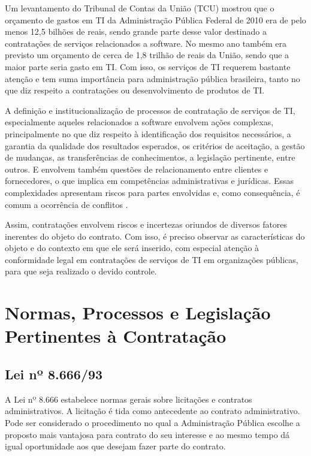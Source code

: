 Um levantamento do Tribunal de Contas da União (TCU) mostrou que o orçamento de gastos em TI da Administração Pública Federal de 2010 era de pelo menos 12,5 bilhões de reais, sendo grande parte desse valor destinado a contratações de serviços relacionados a software. No mesmo ano também era previsto um orçamento de cerca de 1,8 trilhão de reais da União, sendo que a maior parte seria gasto em TI. Com isso, os serviços de TI requerem bastante atenção e tem suma importância para administração pública brasileira, tanto no que diz respeito a contratações ou desenvolvimento de produtos de TI.

A definição e institucionalização de processos de contratação de serviços de TI, especialmente aqueles relacionados a software envolvem ações complexas, principalmente no que diz respeito à identificação dos requisitos necessários, a garantia da qualidade dos resultados esperados, os critérios de aceitação, a gestão de mudanças, as transferências de conhecimentos, a legislação pertinente, entre outros. E envolvem também questões de relacionamento entre clientes e fornecedores, o que implica em competências administrativas e jurídicas. Essas complexidades apresentam riscos para partes envolvidas e, como consequência, é comum a ocorrência de conflitos \cite{cruz2011}.

Assim, contratações envolvem riscos e incertezas oriundos de diversos fatores inerentes do objeto do contrato. Com isso, é preciso observar as características do objeto e do contexto em que ele será inserido, com especial atenção à conformidade legal em contratações de serviços de TI em organizações públicas, para que seja realizado o devido controle.


\section[Normas, Processos e Legislação Pertinentes à Contratação]{Normas, Processos e Legislação Pertinentes à Contratação}

\subsection[Lei nº 8.666/93]{Lei nº 8.666/93}

A Lei nº 8.666 \cite{Lei8666:1993} estabelece normas gerais sobre licitações e contratos administrativos. A licitação é tida como antecedente ao contrato administrativo. Pode ser considerado o procedimento no qual a Administração Pública escolhe a proposto mais vantajosa para contrato do seu interesse e ao mesmo tempo dá igual oportunidade aos que desejam fazer parte do contrato.

